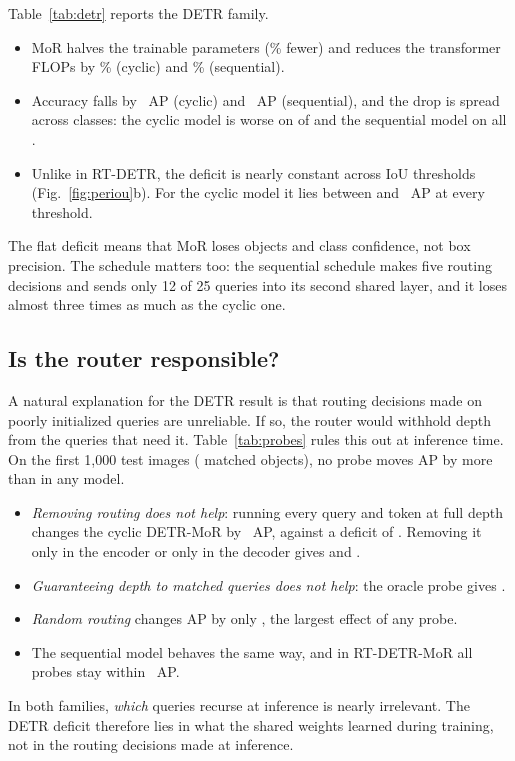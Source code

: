 \documentclass[pdflatex,iicol,sn-basic,Numbered]{sn-jnl}
\begin{document}
Table~\ref{tab:detr} reports the DETR family.
\begin{itemize}
\item MoR halves the trainable parameters (\% fewer) and reduces the transformer FLOPs by \% (cyclic) and \% (sequential).
\item Accuracy falls by ~AP (cyclic) and ~AP (sequential), and the drop is spread across classes: the cyclic model is worse on  of  and the sequential model on all .
\item Unlike in RT-DETR, the deficit is nearly constant across IoU thresholds (Fig.~\ref{fig:periou}b). For the cyclic model it lies between  and ~AP at every threshold.
\end{itemize}
The flat deficit means that MoR loses objects and class confidence, not box precision. The schedule matters too: the sequential schedule makes five routing decisions and sends only 12 of 25 queries into its second shared layer, and it loses almost three times as much as the cyclic one.

\subsection{Is the router responsible?}\label{sec:res-probes}

A natural explanation for the DETR result is that routing decisions made on poorly initialized queries are unreliable. If so, the router would withhold depth from the queries that need it. Table~\ref{tab:probes} rules this out at inference time. On the first 1{,}000 test images ( matched objects), no probe moves AP by more than  in any model.
\begin{itemize}
\item \emph{Removing routing does not help}: running every query and token at full depth changes the cyclic DETR-MoR by ~AP, against a deficit of . Removing it only in the encoder or only in the decoder gives  and .
\item \emph{Guaranteeing depth to matched queries does not help}: the oracle probe gives .
\item \emph{Random routing} changes AP by only , the largest effect of any probe.
\item The sequential model behaves the same way, and in RT-DETR-MoR all probes stay within ~AP.
\end{itemize}
In both families, \emph{which} queries recurse at inference is nearly irrelevant. The DETR deficit therefore lies in what the shared weights learned during training, not in the routing decisions made at inference.
\end{document}
